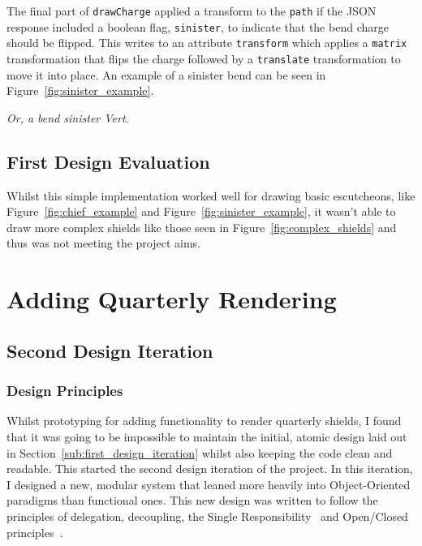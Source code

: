 \documentclass[nobib, a4paper, twoside, justified]{tufte-book}
\makeatletter
\newcommand{\charge}{\gls{charge}\@\xspace}
\makeatother
\begin{document}
The final part of \texttt{drawCharge} applied a transform to the \texttt{path} if the JSON response
included a boolean flag, \texttt{sinister}, to indicate that the bend \charge should be flipped.
This writes to an attribute \texttt{transform} which applies a \texttt{matrix} transformation that
flips the \charge followed by a \texttt{translate} transformation to move it into place. An
example of a sinister bend can be seen in Figure~\ref{fig:sinister_example}.

\begin{marginfigure}
  \centering
  \def\svgwidth{0.8\linewidth}
  
  \caption{\textit{Or, a bend sinister Vert.}}\label{fig:sinister_example}
\end{marginfigure}

\subsection{First Design Evaluation}%
\label{sub:first_design_evaluation}

Whilst this simple implementation worked well for drawing basic \glspl{escutcheon}, like
Figure~\ref{fig:chief_example} and Figure~\ref{fig:sinister_example}, it wasn't able to draw more
complex shields like those seen in Figure~\ref{fig:complex_shields} and thus was not meeting the
project aims.

\section{Adding Quarterly Rendering}%
\label{sec:adding_quarterly_rendering}

\subsection{Second Design Iteration}%
\label{sub:second_design_iteration}

\subsubsection{Design Principles}%
\label{ssub:design_principles}

Whilst prototyping for adding functionality to render quarterly shields, I found that it was going
to be impossible to maintain the initial, atomic design laid out in
Section~\ref{sub:first_design_iteration} whilst also keeping the code clean and readable. This started the
second design iteration of the project. In this iteration, I designed a new, modular system that
leaned more heavily into Object-Oriented paradigms than functional ones. This new design was
written to follow the principles of delegation, decoupling, the Single
Responsibility~\autocite{martin2000design} and Open/Closed principles~\autocite{martin2000design}.
\end{document}

